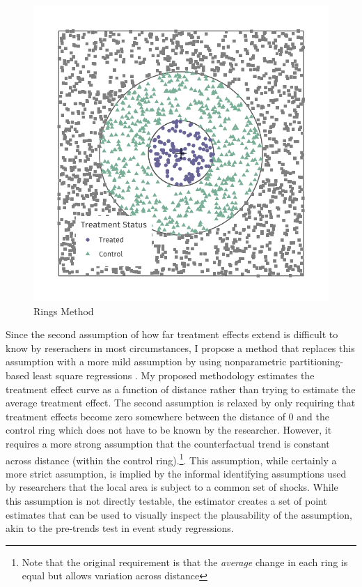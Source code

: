 \documentclass[10pt]{article}
\begin{document}

\begin{figure}[tb]
    \caption{Rings Method}
    \label{fig:example-id}

    \begin{adjustbox}{width = 0.4\textwidth, center}
        \includegraphics[width=\textwidth]{../../figures/example_id.pdf}
    \end{adjustbox}
\end{figure}

Since the second assumption of how far treatment effects extend is difficult to know by reserachers in most circumstances, I propose a method that replaces this assumption with a more mild assumption by using nonparametric partitioning-based least square regressions \citep{Cattaneo_Crump_Farrell_Feng_2019,Cattaneo_Farrell_Feng_2019}. My proposed methodology estimates the treatment effect curve as a function of distance rather than trying to estimate the average treatment effect. The second assumption is relaxed by only requiring that treatment effects become zero somewhere between the distance of 0 and the control ring which does not have to be known by the researcher. However, it requires a more strong assumption that the counterfactual trend is constant across distance (within the control ring).\footnote{Note that the original requirement is that the \emph{average} change in each ring is equal but allows variation across distance}. This assumption, while certainly a more strict assumption, is implied by the informal identifying assumptions used by researchers that the local area is subject to a common set of shocks. While this assumption is not directly testable, the estimator creates a set of point estimates that can be used to visually inspect the plausability of the assumption, akin to the pre-trends test in event study regressions.
\end{document}
